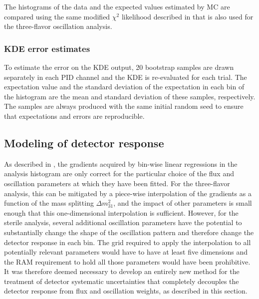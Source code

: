 The histograms of the data and the expected values estimated by MC are compared using the same modified $\chi^2$ likelihood described in  that is also used for the three-flavor oscillation analysis.

\subsubsection{KDE error estimates}
To estimate the error on the KDE output, 20 bootstrap samples are drawn separately in each PID channel and the KDE is re-evaluated for each trial.
The expectation value and the standard deviation of the expectation in each bin of the histogram are the mean and standard deviation of these samples, respectively.
The samples are always produced with the same initial random seed to ensure that expectations and errors are reproducible.

\subsection{Modeling of detector response}
\label{sec:ultrasurfaces}

 As described in , the gradients acquired by bin-wise linear regressions in the analysis histogram are only correct for the particular choice of the flux and oscillation parameters at which they have been fitted.
For the three-flavor analysis, this can be mitigated by a piece-wise interpolation of the gradients as a function of the mass splitting $\Delta m^2_{31}$, and the impact of other parameters is small enough that this one-dimensional interpolation is sufficient.
However, for the sterile analysis, several additional oscillation parameters have the potential to substantially change the shape of the oscillation pattern and therefore change the detector response in each bin.
The grid required to apply the interpolation to all potentially relevant parameters would have to have at least five dimensions and the RAM requirement to hold all those parameters would have been prohibitive.
It was therefore deemed necessary to develop an entirely new method for the treatment of detector systematic uncertainties that completely decouples the detector response from flux and oscillation weights, as described in this section.

